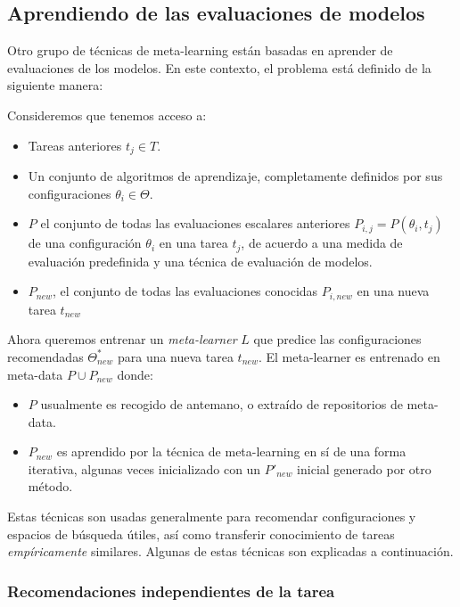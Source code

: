 \subsection{Aprendiendo de las evaluaciones de modelos}\label{subsec:mtl_automl_evaluations}

Otro grupo de técnicas de meta-learning están basadas en aprender de evaluaciones de los modelos. En este contexto, el problema está definido de la siguiente manera:

\begin{definition}
Consideremos que tenemos acceso a:

\begin{itemize}
	\item Tareas anteriores $t_j \in T$.
	\item Un conjunto de algoritmos de aprendizaje, completamente definidos por sus configuraciones $\theta_i \in \Theta$.
	\item $P$ el conjunto de todas las evaluaciones escalares anteriores $P_{i,j} = P(\theta_i, t_j)$ de una configuración $\theta_i$ en una tarea $t_j$, de acuerdo a una medida de evaluación predefinida y una técnica de evaluación de modelos. 
	\item $P_{new}$, el conjunto de todas las evaluaciones conocidas $P_{i, new}$ en una nueva tarea $t_{new}$ 
\end{itemize}

Ahora queremos entrenar un \emph{meta-learner} $L$ que predice las configuraciones recomendadas $\Theta^*_{new}$ para una nueva tarea $t_{new}$. El meta-learner es entrenado en meta-data $P\cup P_{new}$ donde:

\begin{itemize}
	\item $P$ usualmente es recogido de antemano, o extraído de repositorios de meta-data.
	\item $P_{new}$ es aprendido por la técnica de meta-learning en sí de una forma iterativa, algunas veces inicializado con un $P'_{new}$ inicial generado por otro método.
\end{itemize}
\end{definition}

Estas técnicas son usadas generalmente para recomendar configuraciones y espacios de búsqueda útiles, así como transferir conocimiento de tareas \textit{empíricamente} similares. Algunas de estas técnicas son explicadas a continuación. 

\subsubsection{Recomendaciones independientes de la tarea}

